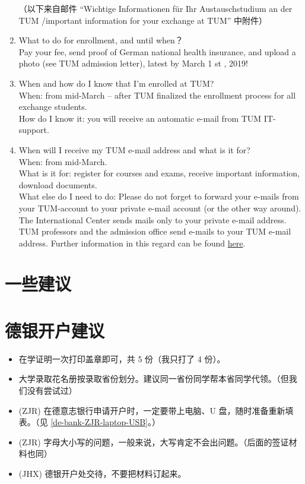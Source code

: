 \documentclass{ctexart}
\begin{document}
\begin{enumerate}
  （以下来自邮件 ``Wichtige Informationen für Ihr Austauschstudium an der TUM /important information for your exchange at TUM'' 中附件）
  \item What to do for enrollment, and until when？ \\
  Pay your fee, send proof of German national health insurance, and upload a photo
  (see TUM admission letter), latest by March 1 st , 2019!
  \item When and how do I know that I’m enrolled at TUM? \\
  When: from mid-March – after TUM finalized the enrollment process for all exchange students. \\
  How do I know it: you will receive an automatic e-mail from TUM IT-support.
  \item When will I receive my TUM e-mail address and what is it for? \\
  When: from mid-March. \\
  What is it for: register for courses and exams, receive important information, download documents. \\
  What else do I need to do: Please do not forget to forward your e-mails from your TUM-account to your
  private e-mail account (or the other way around). The International Center sends mails only to your private
  e-mail address. TUM professors and the admission office send e-mails to your TUM e-mail address. Further
  information in this regard can be found \href{http://www.it.tum.de/en/faq/it-services/e-mail/}{here}.
\end{enumerate}

\section{一些建议}
\section{德银开户建议}
\begin{itemize}
  \item 在学证明一次打印盖章即可，共 5 份（我只打了 4 份）。
  \item 大学录取花名册按录取省份划分。建议同一省份同学帮本省同学代领。（但我们没有尝试过）
  \item (ZJR) 在德意志银行申请开户时，一定要带上电脑、U 盘，随时准备重新填表。（见 \ref{de-bank-ZJR-laptop-USB}。）
  \item (ZJR) 字母大小写的问题，一般来说，大写肯定不会出问题。（后面的签证材料也同）
  \item (JHX) 德银开户处交待，不要把材料订起来。
\end{itemize}
\end{document}
